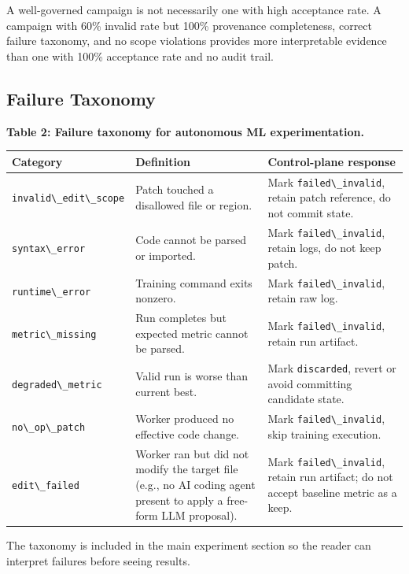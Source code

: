 A well-governed campaign is not necessarily one with high acceptance rate. A campaign with 60\% invalid rate but 100\% provenance completeness, correct failure taxonomy, and no scope violations provides more interpretable evidence than one with 100\% acceptance rate and no audit trail.

\subsection{Failure Taxonomy}\label{failure-taxonomy}

\textbf{Table 2: Failure taxonomy for autonomous ML experimentation.}

\begin{table}[t]
\small
\begin{tabular}{@{}
  >{\raggedright\arraybackslash}p{}
  >{\raggedright\arraybackslash}p{}
  >{\raggedright\arraybackslash}p{}@{}}
\toprule
\begin{minipage}[b]{\linewidth}\raggedright
Category
\end{minipage} & \begin{minipage}[b]{\linewidth}\raggedright
Definition
\end{minipage} & \begin{minipage}[b]{\linewidth}\raggedright
Control-plane response
\end{minipage} \\
\midrule
\bottomrule
\passthrough{\lstinline!invalid\_edit\_scope!} & Patch touched a disallowed file or region. & Mark \passthrough{\lstinline!failed\_invalid!}, retain patch reference, do not commit state. \\
\passthrough{\lstinline!syntax\_error!} & Code cannot be parsed or imported. & Mark \passthrough{\lstinline!failed\_invalid!}, retain logs, do not keep patch. \\
\passthrough{\lstinline!runtime\_error!} & Training command exits nonzero. & Mark \passthrough{\lstinline!failed\_invalid!}, retain raw log. \\
\passthrough{\lstinline!metric\_missing!} & Run completes but expected metric cannot be parsed. & Mark \passthrough{\lstinline!failed\_invalid!}, retain run artifact. \\
\passthrough{\lstinline!degraded\_metric!} & Valid run is worse than current best. & Mark \passthrough{\lstinline!discarded!}, revert or avoid committing candidate state. \\
\passthrough{\lstinline!no\_op\_patch!} & Worker produced no effective code change. & Mark \passthrough{\lstinline!failed\_invalid!}, skip training execution. \\
\passthrough{\lstinline!edit\_failed!} & Worker ran but did not modify the target file (e.g., no AI coding agent present to apply a free-form LLM proposal). & Mark \passthrough{\lstinline!failed\_invalid!}, retain run artifact; do not accept baseline metric as a keep. \\
\end{tabular}
\end{table}

The taxonomy is included in the main experiment section so the reader can interpret failures before seeing results.
